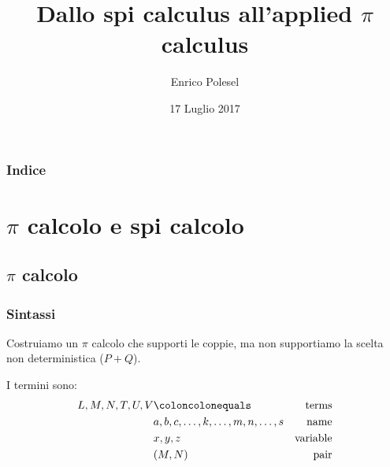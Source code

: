 \title[Applied $\pi$ calculus]{Dallo spi calculus all’applied $\pi$ calculus}
\date{17 Luglio 2017}

\author{Enrico Polesel}



\begin{frame}[plain]
  \titlepage
\end{frame}

\begin{frame}[plain]
 \frametitle{Indice}
 \tableofcontents
\end{frame}




\AtBeginSubsection[]
{
  \begin{frame}[plain]{\secname $\rightarrow$ \subsecname}
    \tableofcontents[currentsubsection]
  \end{frame}
}

\section{$\pi$ calcolo e spi calcolo}

\subsection{$\pi$ calcolo}

\begin{frame}
  \frametitle{Sintassi}
  Costruiamo un $\pi$ calcolo che supporti le coppie, ma non
  supportiamo la scelta non deterministica ($P+Q$).

  I termini sono:
  \begin{align*}
    L,M,N,T,U,V & \coloncolonequals & \text{terms} \\
                & a,b,c,\dots,k,\dots,m,n,\dots,s & \text{name} \\
                & x,y,z & \text{variable} \\
                & (M,N) & \text{pair}
  \end{align*}
\end{frame}

